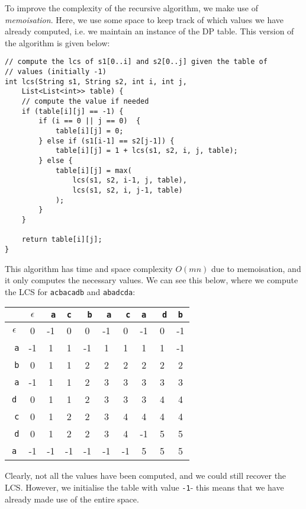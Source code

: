 \documentclass[a4paper, openany]{memoir}
\begin{document}
    To improve the complexity of the recursive algorithm, we make use of \emph{memoisation}. Here, we use some space to keep track of which values we have already computed, i.e. we maintain an instance of the DP table. This version of the algorithm is given below:
\begin{lstlisting}[language=pseudocode]
// compute the lcs of s1[0..i] and s2[0..j] given the table of 
// values (initially -1)
int lcs(String s1, String s2, int i, int j, 
    List<List<int>> table) {
    // compute the value if needed
    if (table[i][j] == -1) {
        if (i == 0 || j == 0)  {
            table[i][j] = 0;
        } else if (s1[i-1] == s2[j-1]) {
            table[i][j] = 1 + lcs(s1, s2, i, j, table);
        } else {
            table[i][j] = max(
                lcs(s1, s2, i-1, j, table), 
                lcs(s1, s2, i, j-1, table)
            );
        }
    }

    return table[i][j];
}
\end{lstlisting}
    This algorithm has time and space complexity $O(mn)$ due to memoisation, and it only computes the necessary values. We can see this below, where we compute the LCS for \texttt{acbacadb} and \texttt{abadcda}:
    \begin{table}[H]
        \centering
        \begin{tabular}{c|ccccccccc}
            & $\epsilon$ & \texttt{\color{blue} a} & \texttt{c} & \texttt{\color{blue} b} & \texttt{\color{blue} a} & \texttt{\color{blue} c} & \texttt{a} & \texttt{\color{blue} d} & \texttt{b} \\
            \hline
            $\epsilon$ & 0 & -1 & 0 & 0 & -1 & 0 & -1 & 0 & -1 \\
            \texttt{\color{blue} a} & -1 & 1 & 1 & -1 & 1 & 1 & 1 & 1 & -1 \\
            \texttt{\color{blue} b} & 0 & 1 & 1 & 2 & 2 & 2 & 2 & 2 & 2 \\
            \texttt{\color{blue} a} & -1 & 1 & 1 & 2 & 3 & 3 & 3 & 3 & 3 \\
            \texttt{d} & 0 & 1 & 1 & 2 & 3 & 3 & 3 & 4 & 4 \\
            \texttt{\color{blue} c} & 0 & 1 & 2 & 2 & 3 & 4 & 4 & 4 & 4 \\
            \texttt{\color{blue} d} & 0 & 1 & 2 & 2 & 3 & 4 & -1 & 5 & 5 \\
            \texttt{a} & -1 & -1 & -1 & -1 & -1 & -1 & 5 & 5 & 5
        \end{tabular}
    \end{table}
    \noindent Clearly, not all the values have been computed, and we could still recover the LCS. However, we initialise the table with value \texttt{-1}- this means that we have already made use of the entire space. 
    
\end{document}

